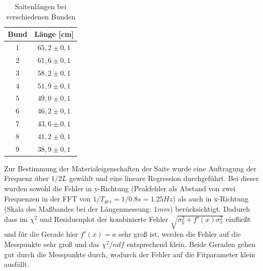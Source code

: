 \documentclass[a4paper, 11pt]{article}
\begin{document}
\begin{table}[H]
\centering
\renewcommand{\arraystretch}{1.2}
\begin{tabular}{|c|c|}
\hline Bund & Länge [cm] \\
\hline $1$ & $65,2 \pm 0,1$ \\
$2$ & $61,6 \pm 0,1$ \\
$3$ & $58,2 \pm 0,1$ \\
$4$ & $51,9 \pm 0,1$ \\
$5$ & $49,0 \pm 0,1$ \\
$6$ & $46,2 \pm 0,1$ \\
$7$ & $43,6 \pm 0,1$ \\
$8$ & $41,2 \pm 0,1$ \\
$9$ & $38,9 \pm 0,1$ \\
\hline
\end{tabular}
\caption{Saitenlängen bei verschiedenen Bunden}
\label{Saitenlängen bei verschiedenen Bunden}
\end{table}


Zur Bestimmung der Materialeigenschaften der Saite wurde eine Auftragung der Frequenz über $1/2L$ gewählt und eine lineare Regression durchgeführt. Bei dieser wurden sowohl die Fehler in y-Richtung (Peakfehler als Abstand von zwei Frequenzen in der FFT von $1/T_{ges} = 1/0.8s = 1.25 Hz$) als auch in x-Richtung (Skala des Maßbandes bei der Längenmessung: $1mm$) berücksichtigt. Dadurch dass im $\chi^2$ und Residuenplot der kombinierte Fehler $\sqrt{\sigma_y^2+f'(x)\sigma_x^2}$ einfließt und für die Gerade hier $f'(x)=a$ sehr groß ist, werden die Fehler auf die Messpunkte sehr groß und das $\chi^2/ndf$ entsprechend klein.
Beide Geraden gehen gut durch die Messpunkte durch, wodurch der Fehler auf die Fitparameter klein ausfällt.
\end{document}
